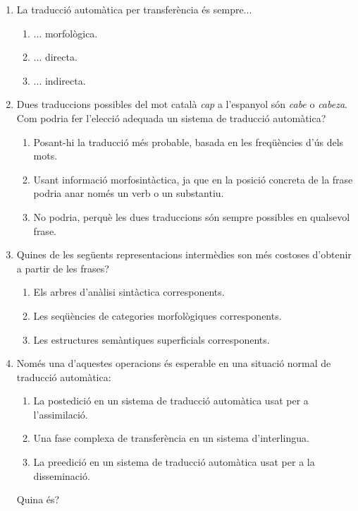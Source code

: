 \begin{enumerate}
\item La traducció automàtica per transferència és sempre...
\begin{enumerate}
\item ... morfològica.
\item ... directa.
\item ... indirecta.
\end{enumerate}

\item Dues traduccions possibles del mot català \emph{cap} 
 a l'espanyol
 són \emph{cabe} o \emph{cabeza}. Com podria fer l'elecció
adequada un sistema de traducció automàtica?
 \begin{enumerate}
 \item Posant-hi la traducció més probable, basada en
 les freqüències d'ús dels mots.
 \item Usant informació morfosintàctica, ja que
 en la posició concreta de la frase podria
 anar només un verb o un substantiu.
 \item No podria, perquè les dues traduccions són
 sempre possibles en qualsevol frase.
 \end{enumerate}

\item Quines  de les següents representacions intermèdies 
      son més costoses d'obtenir a partir de les frases?
      \begin{enumerate}
      \item Els arbres d'anàlisi sintàctica corresponents.
      \item Les seqüències de categories morfològiques
           corresponents.
      \item Les estructures semàntiques superficials corresponents.
      \end{enumerate}

\item Només una d'aquestes operacions és  esperable en una
      situació  normal de traducció automàtica:
      \begin{enumerate}
      \item La postedició en un sistema de traducció automàtica 
            usat per a l'assimilació.
      \item Una fase complexa de 
            transferència en un sistema d'interlingua.
      \item La preedició en un sistema de traducció automàtica
            usat per a la disseminació. 
      \end{enumerate}
      Quina és?



\end{enumerate}
